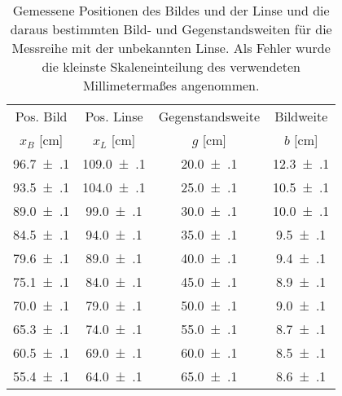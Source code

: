 \begin{table}[!h]
	\centering
	\begin{tabular}{|c|c|c|c|}
		\hline
		Pos. Bild & Pos. Linse & Gegenstandsweite & Bildweite\\
		$x_{B}$ [\si{\centi\meter}] & $x_{L}$ [\si{\centi\meter}] & $g$ [\si{\centi\meter}] & $b$ [\si{\centi\meter}]\\
\hline\hline
		\num{96.7(1)} & \num{109.0(1)} & \num{20.0(1)} & \num{12.3(1)}\\
		\num{93.5(1)} & \num{104.0(1)} & \num{25.0(1)} & \num{10.5(1)}\\
		\num{89.0(1)} & \num{99.0(1)} & \num{30.0(1)} & \num{10.0(1)}\\
		\num{84.5(1)} & \num{94.0(1)} & \num{35.0(1)} & \num{9.5(1)}\\
		\num{79.6(1)} & \num{89.0(1)} & \num{40.0(1)} & \num{9.4(1)}\\
		\num{75.1(1)} & \num{84.0(1)} & \num{45.0(1)} & \num{8.9(1)}\\
		\num{70.0(1)} & \num{79.0(1)} & \num{50.0(1)} & \num{9.0(1)}\\
		\num{65.3(1)} & \num{74.0(1)} & \num{55.0(1)} & \num{8.7(1)}\\
		\num{60.5(1)} & \num{69.0(1)} & \num{60.0(1)} & \num{8.5(1)}\\
		\num{55.4(1)} & \num{64.0(1)} & \num{65.0(1)} & \num{8.6(1)}\\
		\hline
	\end{tabular}
	\caption{Gemessene Positionen des Bildes und der Linse und die daraus bestimmten 
		Bild- und Gegenstandsweiten für die Messreihe mit der unbekannten Linse. Als Fehler wurde die kleinste Skaleneinteilung des
		verwendeten Millimetermaßes angenommen. \label{tab:Auswertung_Messwerte_II}}
\end{table}
